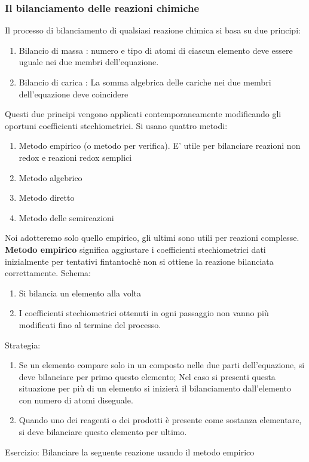 \documentclass{article}
\begin{document}
\subsubsection{Il bilanciamento delle reazioni chimiche}
Il processo di bilanciamento di qualsiasi reazione chimica si basa su due principi:
\begin{enumerate}
    \item Bilancio di massa : numero e tipo di atomi di ciascun elemento deve essere uguale nei due membri dell'equazione.
    \item Bilancio di carica : La somma algebrica delle cariche nei due membri dell'equazione deve coincidere
\end{enumerate}
Questi due principi vengono applicati contemporaneamente modificando gli oportuni coefficienti stechiometrici. Si usano quattro metodi:
\begin{enumerate}
    \item Metodo empirico (o metodo per verifica). E' utile per bilanciare reazioni non redox e reazioni redox semplici
    \item Metodo algebrico
    \item Metodo diretto
    \item Metodo delle semireazioni
\end{enumerate}
Noi adotteremo solo quello empirico, gli ultimi sono utili per reazioni complesse.\\
\textbf{Metodo empirico} significa aggiustare i coefficienti stechiometrici dati inizialmente per tentativi
fintantochè non si ottiene la reazione bilanciata correttamente.
Schema:
\begin{enumerate}
    \item Si bilancia un elemento alla volta
    \item I coefficienti stechiometrici ottenuti in ogni passaggio non vanno più modificati fino al termine del processo.
\end{enumerate}
Strategia:
\begin{enumerate}
    \item Se un elemento compare solo in un composto nelle due parti dell'equazione, si deve bilanciare per primo questo elemento; 
        Nel caso si presenti questa situazione per più di un elemento si inizierà il bilanciamento dall'elemento con numero di atomi diseguale.
    \item Quando uno dei reagenti o dei prodotti è presente come sostanza elementare, si deve bilanciare questo elemento per ultimo.
\end{enumerate}
Esercizio: Bilanciare la seguente reazione usando il metodo empirico
\end{document}
